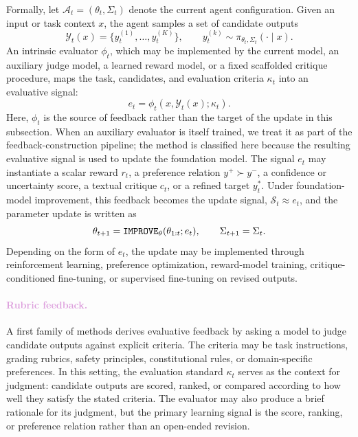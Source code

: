Formally, let $\mathcal{A}_t=(\theta_t,\Sigma_t)$ denote the current agent configuration. Given an input or task context $x$, the agent samples a set of candidate outputs
\begin{equation}
\mathcal{Y}_t(x)=\{y_t^{(1)},\ldots,y_t^{(K)}\}, \qquad 
y_t^{(k)} \sim \pi_{\theta_t,\Sigma_t}(\cdot \mid x).
\end{equation}
An intrinsic evaluator $\phi_t$, which may be implemented by the current model, an auxiliary judge model, a learned reward model, or a fixed scaffolded critique procedure, maps the task, candidates, and evaluation criteria $\kappa_t$ into an evaluative signal:
\begin{equation}
e_t=\phi_t(x,\mathcal{Y}_t(x);\kappa_t).
\end{equation}
Here, $\phi_t$ is the source of feedback rather than the target of the update in this subsection. When an auxiliary evaluator is itself trained, we treat it as part of the feedback-construction pipeline; the method is classified here because the resulting evaluative signal is used to update the foundation model. The signal $e_t$ may instantiate a scalar reward $r_t$, a preference relation $y^+\succ y^-$, a confidence or uncertainty score, a textual critique $c_t$, or a refined target $y_t^\ast$. Under foundation-model improvement, this feedback becomes the update signal, $\mathcal{S}_t\approx e_t$, and the parameter update is written as
\begin{equation}
\theta_{t+1}=\operatorname{\mathtt{IMPROVE}}_{\theta}(\theta_{1:t};e_t), \qquad \Sigma_{t+1}=\Sigma_t.
\end{equation}
Depending on the form of $e_t$, the update may be implemented through reinforcement learning, preference optimization, reward-model training, critique-conditioned fine-tuning, or supervised fine-tuning on revised outputs.

\paragraph{\textcolor{Plum}{Rubric feedback.}}
A first family of methods derives evaluative feedback by asking a model to judge candidate outputs against explicit criteria. The criteria may be task instructions, grading rubrics, safety principles, constitutional rules, or domain-specific preferences. In this setting, the evaluation standard $\kappa_t$ serves as the context for judgment: candidate outputs are scored, ranked, or compared according to how well they satisfy the stated criteria. The evaluator may also produce a brief rationale for its judgment, but the primary learning signal is the score, ranking, or preference relation rather than an open-ended revision.

